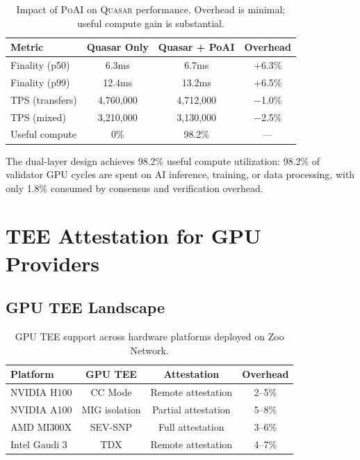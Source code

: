 \documentclass[11pt,letterpaper]{article}
\newcommand{\PoAI}{\textsc{PoAI}}
\newcommand{\Quasar}{\textsc{Quasar}}
\begin{document}
\begin{table}[t]
\centering
\begin{tabular}{lccc}
\toprule
\textbf{Metric} & \textbf{Quasar Only} & \textbf{Quasar + PoAI} & \textbf{Overhead} \\
\midrule
Finality (p50) & 6.3ms & 6.7ms & +6.3\% \\
Finality (p99) & 12.4ms & 13.2ms & +6.5\% \\
TPS (transfers) & 4,760,000 & 4,712,000 & $-$1.0\% \\
TPS (mixed) & 3,210,000 & 3,130,000 & $-$2.5\% \\
Useful compute & 0\% & 98.2\% & --- \\
\bottomrule
\end{tabular}
\caption{Impact of \PoAI{} on \Quasar{} performance. Overhead is minimal; useful compute gain is substantial.}
\label{tab:useful}
\end{table}

The dual-layer design achieves 98.2\% useful compute utilization: 98.2\% of validator GPU cycles are spent on AI inference, training, or data processing, with only 1.8\% consumed by consensus and verification overhead.

\section{TEE Attestation for GPU Providers}
\label{sec:tee}

\subsection{GPU TEE Landscape}

\begin{table}[t]
\centering
\begin{tabular}{lccc}
\toprule
\textbf{Platform} & \textbf{GPU TEE} & \textbf{Attestation} & \textbf{Overhead} \\
\midrule
NVIDIA H100 & CC Mode & Remote attestation & 2--5\% \\
NVIDIA A100 & MIG isolation & Partial attestation & 5--8\% \\
AMD MI300X & SEV-SNP & Full attestation & 3--6\% \\
Intel Gaudi 3 & TDX & Remote attestation & 4--7\% \\
\bottomrule
\end{tabular}
\caption{GPU TEE support across hardware platforms deployed on Zoo Network.}
\label{tab:tee}
\end{table}
\end{document}
